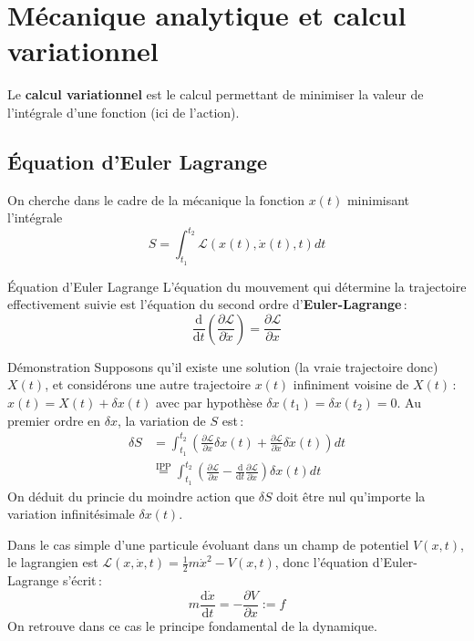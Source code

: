 \section{Mécanique analytique et calcul variationnel}

    Le \textbf{calcul variationnel} est le calcul permettant de minimiser la valeur de l’intégrale d’une fonction (ici de l’action).

    \subsection{Équation d’Euler Lagrange}

    On cherche dans le cadre de la mécanique la fonction $x(t)$ minimisant l’intégrale 
    \[ S = \int_{t_1}^{t_2} \mathcal{L}(x(t), \dot{x}(t), t) dt \]   

    \begin{omed}{Équation d’Euler Lagrange}
        L’équation du mouvement qui détermine la trajectoire effectivement suivie est l’équation du second ordre d’\textbf{Euler-Lagrange} :
        \[ \frac{\text{d}}{\text{d}t}\left(\frac{\partial \mathcal{L}}{\partial \dot{x}} \right) = \frac{\partial \mathcal{L}}{\partial x} \]   
    \end{omed}

    \begin{demo}{Démonstration}
        Supposons qu’il existe une solution (la vraie trajectoire donc) $X(t)$, et considérons une autre trajectoire $x(t)$ infiniment voisine de $X(t)$ :  $x(t) = X(t) + \delta x(t)$ avec par hypothèse $\delta x(t_1) = \delta x(t_2) = 0$. Au premier ordre en $\delta x$, la variation de $S$ est :
        \begin{align*}
            \delta S 
            &= \int_{t_1}^{t_2} \left(\frac{\partial \mathcal{L}}{\partial x} \delta x(t) + \frac{\partial \mathcal{L}}{\partial \dot{x}} \delta \dot{x}(t) \right) dt \\
            &\overset{\text{IPP}}{=} \int_{t_1}^{t_2} \left(\frac{\partial \mathcal{L}}{\partial x} - \frac{\text{d}}{\text{d}t} \frac{\partial \mathcal{L}}{\partial \dot{x}} \right) \delta x(t)  dt
        \end{align*}
        On déduit du princie du moindre action que $\delta S$ doit être nul qu’importe la variation infinitésimale $\delta x(t)$. 
    \end{demo}

    Dans le cas simple d’une particule évoluant dans un champ de potentiel $V(x,t)$, le lagrangien est $\mathcal{L}(x,\dot{x},t) = \frac{1}{2} m \dot{x}^2 - V(x,t)$, donc l’équation d’Euler-Lagrange s’écrit :
    \[ m \frac{\text{d} \dot{x}}{\text{d}t} = - \frac{\partial V}{\partial x} := f \]   
    On retrouve dans ce cas le principe fondamental de la dynamique.

